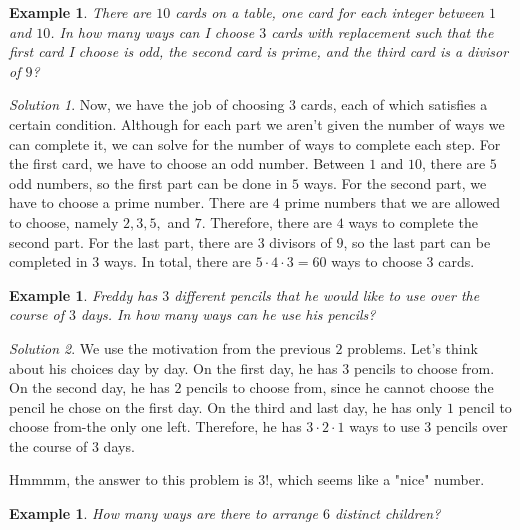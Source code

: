 \documentclass[letterpaper]{article}
\newtheorem{example}[thm]{Example}
\theoremstyle{remark}
\newtheorem*{solution}{Solution}
\theoremstyle{definition}
\begin{document}
\begin{example}

There are $10$ cards on a table, one card for each integer between $1$ and $10$. In how many ways can I choose $3$ cards with replacement such that the first card I choose is odd, the second card is prime, and the third card is a divisor of $9$?
\end{example}

\begin{solution}

Now, we have the job of choosing $3$ cards, each of which satisfies a certain condition. Although for each part we aren't given the number of ways we can complete it, we can solve for the number of ways to complete each step. For the first card, we have to choose an odd number. Between $1$ and $10$, there are $5$ odd numbers, so the first part can be done in $5$ ways. For the second part, we have to choose a prime number. There are $4$ prime numbers that we are allowed to choose, namely $2, 3, 5, $ and $7$. Therefore, there are $4$ ways to complete the second part. For the last part, there are $3$ divisors of $9$, so the last part can be completed in $3$ ways. In total, there are $5\cdot 4 \cdot 3=60$ ways to choose $3$ cards.
\end{solution}


\begin{example}
Freddy has $3$ different pencils that he would like to use over the course of $3$ days. In how many ways can he use his pencils?

\end{example}

\begin{solution}
We use the motivation from the previous $2$ problems. Let's think about his choices day by day. On the first day, he has $3$ pencils to choose from. On the second day, he has $2$ pencils to choose from, since he cannot choose the pencil he chose on the first day. On the third and last day, he has only $1$ pencil to choose from-the only one left. Therefore, he has $3\cdot 2\cdot 1$ ways to use $3$ pencils over the course of $3$ days.
\end{solution}



Hmmmm, the answer to this problem is $3!$, which seems like a "nice" number. 

\begin{example}

How many ways are there to arrange $6$ distinct children?
\end{example}
\end{document}
